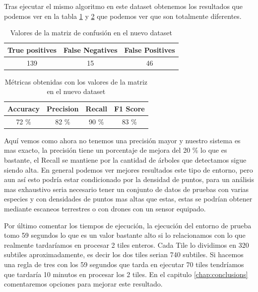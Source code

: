 Tras ejecutar el mismo algoritmo en este dataset obtenemos los resultados que podemos ver en la tabla \ref{tablaconf2} y \ref{tablaMetr2} que podemos ver que son totalmente diferentes.

\begin{table}[!h]
\centering
{}
\begin{tabular}{c|c|c}
\rowcolor{udcpink!25}
\textbf{True positives} & \textbf{False Negatives} & \textbf{False Positives} \\\hline
139 & 15 & 46 \\
\end{tabular}
\caption{Valores de la matriz de confusión en el nuevo dataset}
\label{tablaconf2}
\end{table}
\begin{table}[!h]
\centering
{}
\begin{tabular}{c|c|c|c}
\rowcolor{udcpink!25}
\textbf{Accuracy} & \textbf{Precision} & \textbf{Recall} & \textbf{F1 Score} \\\hline
72 \% & 82 \% & 90 \% & 83 \% \\
\end{tabular}
\caption{Métricas obtenidas con los valores de la matriz en el nuevo dataset}
\label{tablaMetr2}
\end{table}

Aquí vemos como ahora no tenemos una precisión mayor y nuestro sistema es mas exacto, la precisión tiene un porcentaje de mejora del 20 \% lo que es bastante, el Recall se mantiene por la cantidad de árboles que detectamos sigue siendo alta. En general podemos ver mejores resultados este tipo de entorno, pero aun así esto podría estar condicionado por la densidad de puntos, para un análisis mas exhaustivo seria necesario tener un conjunto de datos de pruebas con varias especies y con densidades de puntos mas altas que estas, estas se podrían obtener mediante escaneos terrestres o con drones con un sensor equipado.

Por último comentar los tiempos de ejecución, la ejecución del entorno de prueba tomo 59 segundos lo que es un valor bastante alto si lo relacionamos con lo que realmente tardaríamos en procesar 2 tiles enteros.
Cada Tile lo dividimos en 320 subtiles aproximadamente, es decir los dos tiles serian 740 subtiles. Si hacemos una regla de tres con los 59 segundos que tarda en ejecutar 70 tiles tendríamos que tardaría 10 minutos en procesar los 2 tiles. En el capitulo \ref{chap:conclusions} comentaremos opciones para mejorar este resultado.


